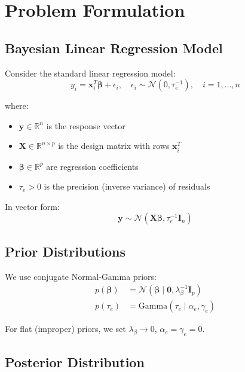 \documentclass[11pt]{article}
\newcommand{\R}{\mathbb{R}}
\newcommand{\N}{\mathcal{N}}
\begin{document}
\tableofcontents
\newpage

\section{Problem Formulation}

\subsection{Bayesian Linear Regression Model}

Consider the standard linear regression model:
\begin{equation}
y_i = \bm{x}_i^T \bm{\beta} + \epsilon_i, \quad \epsilon_i \sim \N(0, \tau_e^{-1}), \quad i = 1,\ldots,n
\end{equation}

where:
\begin{itemize}
\item $\bm{y} \in \R^n$ is the response vector
\item $\bm{X} \in \R^{n \times p}$ is the design matrix with rows $\bm{x}_i^T$
\item $\bm{\beta} \in \R^p$ are regression coefficients
\item $\tau_e > 0$ is the precision (inverse variance) of residuals
\end{itemize}

In vector form:
\begin{equation}
\bm{y} \sim \N(\bm{X}\bm{\beta}, \tau_e^{-1} \bm{I}_n)
\end{equation}

\subsection{Prior Distributions}

We use conjugate Normal-Gamma priors:
\begin{align}
p(\bm{\beta}) &= \N(\bm{\beta} \mid \bm{0}, \lambda_\beta^{-1} \bm{I}_p) \label{eq:prior_beta}\\
p(\tau_e) &= \text{Gamma}(\tau_e \mid \alpha_e, \gamma_e) \label{eq:prior_tau}
\end{align}

For flat (improper) priors, we set $\lambda_\beta \to 0$, $\alpha_e = \gamma_e = 0$.

\subsection{Posterior Distribution}
\end{document}
